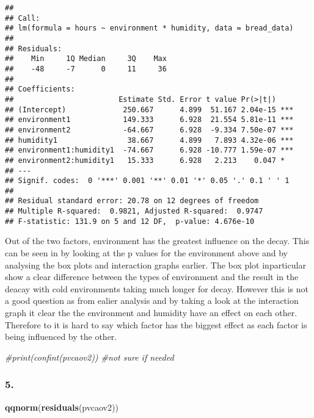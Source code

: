 \documentclass[11pt,]{article}
\newenvironment{Shaded}{\begin{snugshade}}{\end{snugshade}}
\newcommand{\KeywordTok}[1]{\textcolor[rgb]{0.13,0.29,0.53}{\textbf{{#1}}}}
\newcommand{\CommentTok}[1]{\textcolor[rgb]{0.56,0.35,0.01}{\textit{{#1}}}}
\newcommand{\NormalTok}[1]{{#1}}
\begin{document}
\begin{verbatim}
## 
## Call:
## lm(formula = hours ~ environment * humidity, data = bread_data)
## 
## Residuals:
##    Min     1Q Median     3Q    Max 
##    -48     -7      0     11     36 
## 
## Coefficients:
##                        Estimate Std. Error t value Pr(>|t|)    
## (Intercept)             250.667      4.899  51.167 2.04e-15 ***
## environment1            149.333      6.928  21.554 5.81e-11 ***
## environment2            -64.667      6.928  -9.334 7.50e-07 ***
## humidity1                38.667      4.899   7.893 4.32e-06 ***
## environment1:humidity1  -74.667      6.928 -10.777 1.59e-07 ***
## environment2:humidity1   15.333      6.928   2.213    0.047 *  
## ---
## Signif. codes:  0 '***' 0.001 '**' 0.01 '*' 0.05 '.' 0.1 ' ' 1
## 
## Residual standard error: 20.78 on 12 degrees of freedom
## Multiple R-squared:  0.9821, Adjusted R-squared:  0.9747 
## F-statistic: 131.9 on 5 and 12 DF,  p-value: 4.676e-10
\end{verbatim}

Out of the two factors, environment has the greatest influence on the
decay. This can be seen in by looking at the p values for the
environment above and by analysing the box plots and interaction graphs
earlier. The box plot inparticular show a clear difference between the
types of environment and the result in the deacay with cold environments
taking much longer for decay. However this is not a good question as
from ealier analysis and by taking a look at the interaction graph it
clear the the environment and humidity have an effect on each other.
Therefore to it is hard to say which factor has the biggest effect as
each factor is being influenced by the other.

\begin{Shaded}
\begin{Highlighting}[]
  \CommentTok{#print(confint(pvcaov2)) #not sure if needed}
\end{Highlighting}
\end{Shaded}

\subsubsection{5.}\label{section-4}

\begin{Shaded}
\begin{Highlighting}[]
  \KeywordTok{qqnorm}\NormalTok{(}\KeywordTok{residuals}\NormalTok{(pvcaov2))}
\end{Highlighting}
\end{Shaded}
\end{document}
